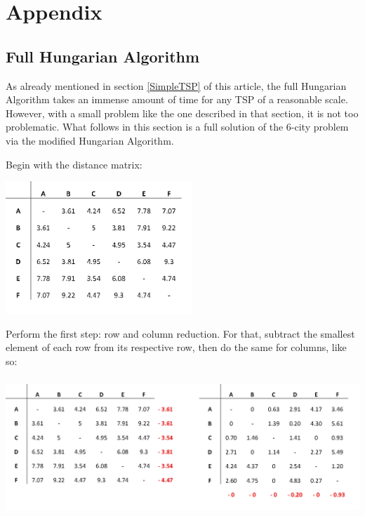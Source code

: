 \newpage
\section{Appendix}


\subsection{Full Hungarian Algorithm}
\label{FullHA}

As already mentioned in section \ref{SimpleTSP} of this article, the full Hungarian Algorithm takes an immense amount of time for any TSP of a reasonable scale. However, with a small problem like the one described in that section, it is not too problematic. What follows in this section is a full solution of the 6-city problem via the modified Hungarian Algorithm. 

\vspace{4mm}
\noindent Begin with the distance matrix:

\begin{center}
	\includegraphics[height=5cm]{distancematrix}
\end{center}

\noindent
Perform the first step: row and column reduction. For that, subtract the smallest element of each row from its respective row, then do the same for columns, like so:

\begin{center}
\includegraphics[height=5.2cm]{1red0}  
\end{center}

